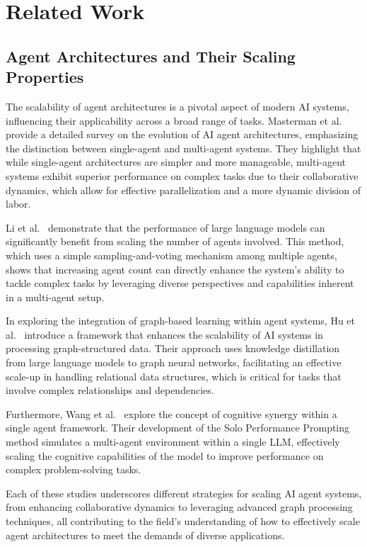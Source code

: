 \section{Related Work}
\subsection{Agent Architectures and Their Scaling Properties}
The scalability of agent architectures is a pivotal aspect of modern AI systems, influencing their applicability across a broad range of tasks. Masterman et al.~\cite{masterman2024landscape} provide a detailed survey on the evolution of AI agent architectures, emphasizing the distinction between single-agent and multi-agent systems. They highlight that while single-agent architectures are simpler and more manageable, multi-agent systems exhibit superior performance on complex tasks due to their collaborative dynamics, which allow for effective parallelization and a more dynamic division of labor.

Li et al.~\cite{li2024agents} demonstrate that the performance of large language models can significantly benefit from scaling the number of agents involved. This method, which uses a simple sampling-and-voting mechanism among multiple agents, shows that increasing agent count can directly enhance the system's ability to tackle complex tasks by leveraging diverse perspectives and capabilities inherent in a multi-agent setup.

In exploring the integration of graph-based learning within agent systems, Hu et al.~\cite{hu2024large} introduce a framework that enhances the scalability of AI systems in processing graph-structured data. Their approach uses knowledge distillation from large language models to graph neural networks, facilitating an effective scale-up in handling relational data structures, which is critical for tasks that involve complex relationships and dependencies.

Furthermore, Wang et al.~\cite{wang2024unleashing} explore the concept of cognitive synergy within a single agent framework. Their development of the Solo Performance Prompting method simulates a multi-agent environment within a single LLM, effectively scaling the cognitive capabilities of the model to improve performance on complex problem-solving tasks.

Each of these studies underscores different strategies for scaling AI agent systems, from enhancing collaborative dynamics to leveraging advanced graph processing techniques, all contributing to the field's understanding of how to effectively scale agent architectures to meet the demands of diverse applications.


